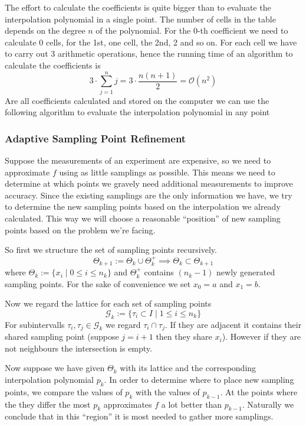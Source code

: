 The effort to calculate the coefficients is quite bigger than to evaluate the interpolation polynomial in a single point.
The number of cells in the table depends on the degree \(n\) of the polynomial.
For the 0-th coefficient we need to calculate 0 cells, for the 1st, one cell, the 2nd, 2 and so on.
For each cell we have to carry out 3 arithmetic operations, hence the running time of an algorithm to calculate the coefficients is
\[3 \cdot \sum_{j=1}^n j = 3 \cdot \frac{n(n+1)}{2} = \mathcal{O}(n^2)\]
Are all coefficients calculated and stored on the computer we can use the following algorithm to evaluate the interpolation polynomial in any point





\subsubsection{Adaptive Sampling Point Refinement}\label{ssec:adapt_refine}
Suppose the measurements of an experiment are expensive, so we need to approximate \(f\) using as little samplings as possible.
This means we need to determine at which points we gravely need additional measurements to improve accuracy.
Since the existing samplings are the only information we have, we try to determine the new sampling points based on the interpolation we already calculated.
This way we will choose a reasonable ``position'' of new sampling points based on the problem we're facing.

So first we structure the set of sampling points recursively.
\[\Theta_{k+1} := \Theta_k \cup \Theta_k^+ \implies \Theta_k \subset \Theta_{k+1}\]
where \(\Theta_k := \{x_i \mid 0 \leq i \leq n_k\}\) and \(\Theta_k^+\) contains \((n_k-1)\) newly generated sampling points.
For the sake of convenience we set \(x_0 = a\) and \(x_1 = b\).

Now we regard the lattice for each set of sampling points
\[\mathcal{G}_k := \{\tau_i \subset I \mid 1 \leq i \leq n_k\}\]
For subintervalls \(\tau_i, \tau_j \in \mathcal{G}_k\) we regard \(\tau_i \cap \tau_j\).
If they are adjacent it contains their shared sampling point (suppose \(j = i + 1\) then they share \(x_i\)).
However if they are not neighbours the intersection is empty.

Now suppose we have given \(\Theta_k\) with its lattice and the corresponding interpolation polynomial \(p_k\).
In order to determine where to place new sampling points, we compare the values of \(p_k\) with the values of \(p_{k-1}\).
At the points where the they differ the most \(p_k\) approximates \(f\) a lot better than \(p_{k-1}\).
Naturally we conclude that in this ``region'' it is most needed to gather more samplings.

